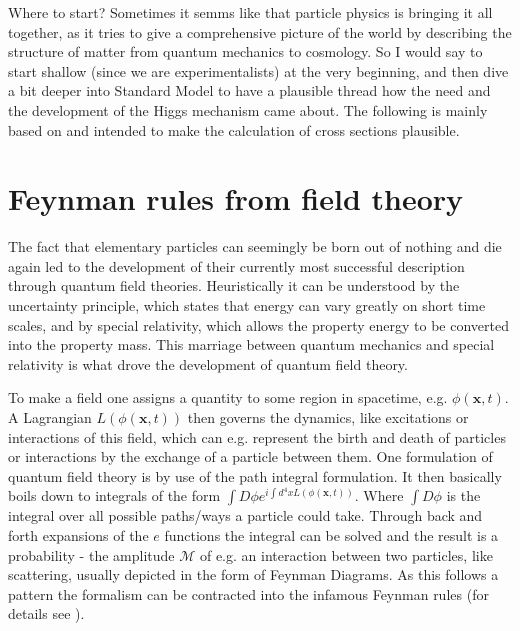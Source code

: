 
Where to start? Sometimes it semms like that particle physics is bringing it all together, as it tries to give a comprehensive picture of the world by describing the structure of matter from quantum mechanics to cosmology. So I would say to start shallow (since we are experimentalists) at the very beginning, and then dive a bit deeper into Standard Model to have a plausible thread how the need and the development of the Higgs mechanism came about. The following is mainly based on \citep{zee2010quantum,griffiths2020introduction} and intended to make the calculation of cross sections plausible.

\section{Feynman rules from field theory}\label{sec:field_theory}
The fact that elementary particles can seemingly be born out of nothing and die again led to the development of their currently most successful description through quantum field theories. Heuristically it can be understood by the uncertainty principle, which states that energy can vary greatly on short time scales, and by special relativity, which allows the property energy to be converted into the property mass. This marriage between quantum mechanics and special relativity is what drove the development of quantum field theory. 


To make a field one assigns a quantity to some region in spacetime, e.g. $\phi(\bm{x},t)$. A Lagrangian $L(\phi(\bm{x},t))$ then governs the dynamics, like excitations or interactions of this field, which can e.g. represent the birth and death of particles or interactions by the exchange of a particle between them. One formulation of quantum field theory is by use of the path integral formulation. It then basically boils down to integrals of the form $\int D\phi e^{i\int d^4x L(\phi(\bm{x},t))}$. Where $\int D\phi$ is the integral over all possible paths/ways a particle could take. Through back and forth expansions of the $e$ functions the integral can be solved and the result is a probability - the amplitude $\mathcal{M}$ of e.g. an interaction between two particles, like scattering, usually depicted in the form of Feynman Diagrams. As this follows a pattern the formalism can be contracted into the infamous Feynman rules (for details see \citep{griffiths2020introduction}). 


